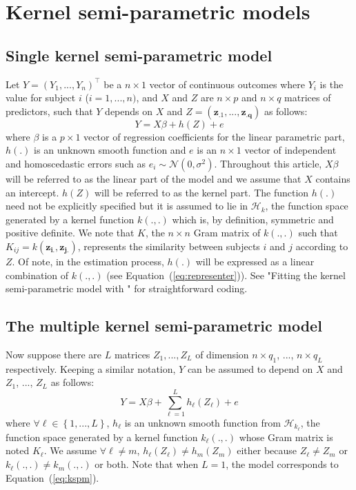 \section{Kernel semi-parametric models}

\subsection{Single kernel semi-parametric model} \label{sec:models-notations-skspm}

Let $Y = (Y_1, ..., Y_n)^\top$ be a $n \times 1$ vector of continuous outcomes where $Y_i$ is the value for subject $i$ ($i = 1, ..., n)$, and $X$ and $Z$ are $n \times p$ and $n \times q$ matrices of predictors, such that $Y$ depends on $X$ and $Z = (\mathbf{z_{.1}} , ..., \mathbf{z_{.q}})$ as follows:
\begin{equation} \label{eq:kspm}
Y = X\beta + h(Z) + e
\end{equation}
where $\beta$ is a $p \times 1$ vector of regression coefficients for the linear parametric part, $h(.)$ is an unknown smooth function and $e$ is an $n \times 1$ vector of independent and homoscedastic errors such as $e_i \sim \mathcal{N}(0, \sigma^2)$. Throughout this article, $X\beta$ will be referred to as the linear part of the model and we assume that $X$ contains an intercept. $h(Z)$ will be referred to as the kernel part. The function $h(.)$ need not be explicitly specified but it is assumed to lie in $\mathcal{H}_k$, the function space generated by a kernel function $k(.,.)$ which is, by definition, symmetric and positive definite. We note that $K$, the $n \times n$ Gram matrix of $k(.,.)$ such that $K_{ij} = k(\mathbf{z_{i.}}, \mathbf{z_{j.}})$, represents the similarity between subjects $i$ and $j$ according to $Z$. Of note, in the estimation process, $h(.)$ will be expressed as a linear combination of $k(.,.)$ (see Equation~(\ref{eq:representer})). See "Fitting the kernel semi-parametric model with " for straightforward coding.

\subsection{The multiple kernel semi-parametric model} \label{sec:models-notations-mkspm}

Now suppose there are $L$ matrices $Z_1, ..., Z_L$ of dimension $n \times q_1$, ..., $n \times q_L$ respectively. Keeping a similar notation, $Y$ can be assumed to depend on $X$ and $Z_1$, ..., $Z_L$ as follows:
\begin{equation} \label{eq:mkspm}
Y = X\beta + \sum\limits_{\ell = 1}^L h_{\ell}(Z_{\ell}) + e
\end{equation}
where $\forall \ell \in \left\lbrace 1, ..., L \right\rbrace$, $h_{\ell}$ is an unknown smooth function from $\mathcal{H}_{k_{\ell}}$, the function space generated by a kernel function $k_{\ell}(.,.)$ whose Gram matrix is noted $K_{\ell}$. We assume $\forall \ell \neq m$, $h_{\ell}(Z_{\ell}) \neq h_{m}(Z_{m})$ either because $Z_{\ell} \neq Z_{m}$ or $k_{\ell}(.,.) \neq k_{m}(.,.)$ or both. Note that when $L = 1$, the model corresponds to Equation~(\ref{eq:kspm}).


